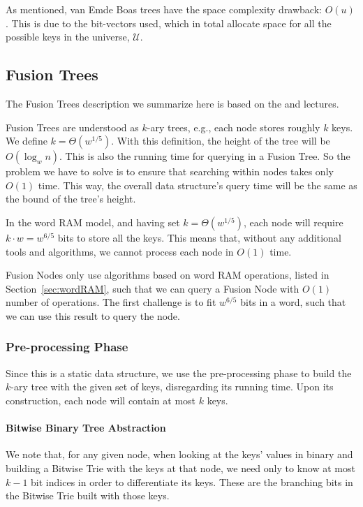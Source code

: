 As mentioned, van Emde Boas trees have the space complexity drawback: $O(u)$.
This is due to the bit-vectors used, which in total allocate space for all the possible keys in the universe, $\mathcal U$.

\subsection{Fusion Trees}

The Fusion Trees description we summarize here is based on the \cite{nelsonjelanilec2} and \cite{erikdemainelec12} lectures.

Fusion Trees are understood as $k$-ary trees, e.g., each node stores roughly $k$ keys.
We define $k = \Theta(w^{1/5})$.
With this definition, the height of the tree will be $O(\log_w n)$.
This is also the running time for querying in a Fusion Tree.
So the problem we have to solve is to ensure that searching within nodes takes only $O(1)$ time.
This way, the overall data structure's query time will be the same as the bound of the tree's height.

In the word RAM model, and having set $k = \Theta(w^{1/5})$, each node will require $k \cdot w = w^{6/5}$ bits to store all the keys.
This means that, without any additional tools and algorithms, we cannot process each node in $O(1)$ time.

Fusion Nodes only use algorithms based on word RAM operations, listed in Section~\ref{sec:wordRAM}, such that we can query a Fusion Node with $O(1)$ number of operations.
The first challenge is to fit $w^{6/5}$ bits in a word, such that we can use this result to query the node.

\subsubsection{Pre-processing Phase}

Since this is a static data structure, we use the pre-processing phase to build the $k$-ary tree with the given set of keys, disregarding its running time.
Upon its construction, each node will contain at most $k$ keys.

\paragraph*{Bitwise Binary Tree Abstraction}\label{par:bitwiseTrieAbstraction} We note that, for any given node, when looking at the keys' values in binary and building a Bitwise Trie with the keys at that node, we need only to know at most $k - 1$ bit indices in order to differentiate its keys.
These are the branching bits in the Bitwise Trie built with those keys.


